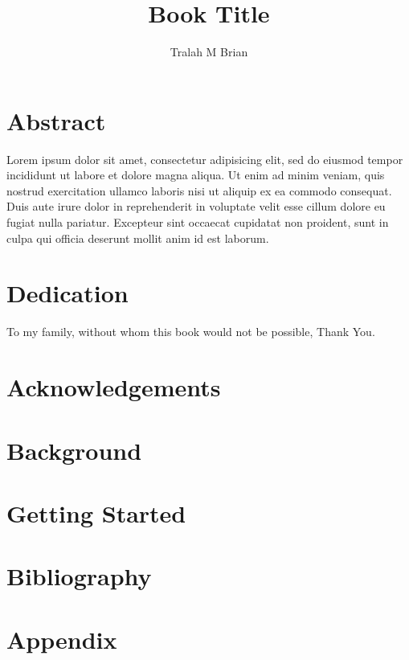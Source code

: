 \documentclass{book} \usepackage{graphicx}
\title{Book Title}
\author{Tralah M Brian}
\begin{document}
\maketitle
\chapter*{Abstract}
Lorem ipsum dolor sit amet, consectetur adipisicing elit, sed do eiusmod tempor incididunt ut labore et dolore magna aliqua. Ut enim ad minim veniam, quis nostrud exercitation ullamco laboris nisi ut aliquip ex ea commodo consequat. Duis aute irure dolor in reprehenderit in voluptate velit esse cillum dolore eu fugiat nulla pariatur. Excepteur sint occaecat cupidatat non proident, sunt in culpa qui officia deserunt mollit anim id est laborum.
\cite{TralahTek}
\chapter*{Dedication}
To my family, without whom this book would not be possible, Thank You.
\chapter*{Acknowledgements}
\tableofcontents
\chapter{Background}
\chapter{Getting Started}
\chapter{Bibliography}
\printbibliography
\chapter*{Appendix}
\end{document}
